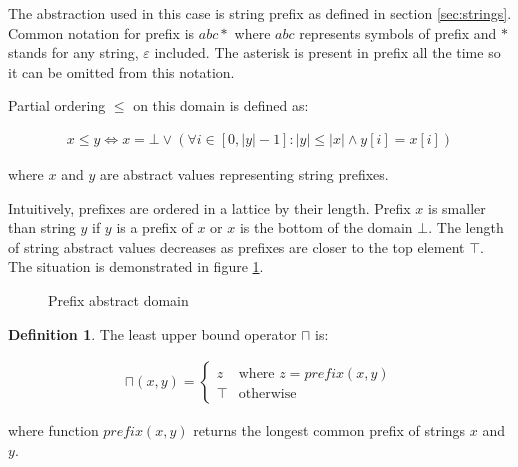 \documentclass[12pt,final,oneside]{fithesis2}
\theoremstyle{definition}
\newtheorem{definition}{Definition}
\begin{document}
The abstraction used in this case is string prefix as defined in section
\ref{sec:strings}. Common notation for prefix is $abc*$ where $abc$
represents symbols of prefix and $*$ stands for any string, $\varepsilon$
included. The asterisk is present in prefix all the time so it can be
omitted from this notation.

Partial ordering $\leq$ on this domain is defined as:

\begin{align*}
x \leq y \Leftrightarrow
  x = \bot \lor (\forall i \in [0, |y| - 1] :
  |y| \leq |x| \land y[i] = x[i])
\end{align*}

where $x$ and $y$ are abstract values representing string prefixes.

Intuitively, prefixes are ordered in a lattice by their length. Prefix
$x$ is smaller than string $y$ if $y$ is a
prefix of $x$ or $x$ is the bottom of the domain $\bot$.
The length of string abstract values decreases as prefixes are closer to
the top element $\top$. The situation is demonstrated in figure
\ref{fig:prefixlattice}.

\begin{figure}[ht]
\centering
{}
\caption{Prefix abstract domain}
\label{fig:prefixlattice}
\end{figure}

\begin{definition}
\label{def:prefixjoin}
The least upper bound operator $\sqcap$ is:

\begin{align*}
\sqcap (x, y) =
\begin{cases}
z & \text{where } z
  = \textit{prefix}(x, y) \\
\top       & \text{otherwise}
\end{cases}
\end{align*}

where function $\textit{prefix}(x, y)$ returns the longest common prefix of
strings $x$ and $y$.
\end{definition}
\end{document}
